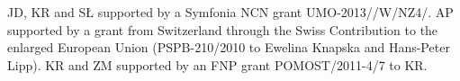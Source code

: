 JD, KR and SŁ supported by a Symfonia NCN grant UMO-2013//\allowbreak W/\allowbreak NZ4/.
AP supported by a grant from Switzerland
through the Swiss Contribution to the enlarged European Union (PSPB-210/2010
to Ewelina Knapska and Hans-Peter Lipp).
KR and ZM supported by an FNP grant POMOST/2011-4/7 to KR.
